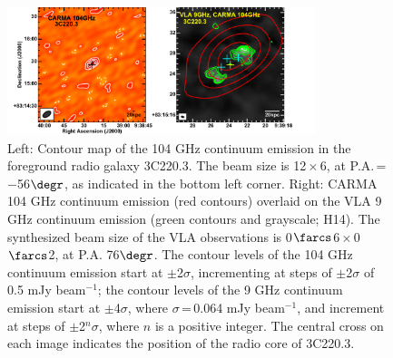 \documentclass[twocolumn,apj,numberedappendix]{emulateapj}
\newcommand{\CO}{\mbox{CO($J$\,=\,3\,$\rightarrow$\,2) }}
\newcommand{\pmOne}{\mbox{$^{-1}$}}
\begin{document}
\begin{figure}[tbph]
\centering
\includegraphics[width=0.80\textwidth]{Figure/ContPanel.pdf}
\caption{Left: Contour map of the 104 GHz continuum emission in the foreground radio galaxy 3C220.3. 
The beam size is 12\,$\times$\,6, at P.A.\,=\,
$-$56$\degr$, as indicated in the bottom left corner. Right: CARMA 104 GHz continuum emission (red contours) overlaid on the VLA 9 GHz continuum emission (green contours and grayscale; H14). 
The synthesized beam size of the VLA observations is 0$\farcs$6\,$\times$\,0$\farcs$2, at P.A. 
76$\degr$. The contour levels of the 104 GHz continuum emission start at $\pm$2$\sigma$, incrementing at steps 
of $\pm$2$\sigma$ of 0.5 mJy beam\pmOne; the contour levels of the 9 GHz continuum 
emission start at $\pm$4$\sigma$, where $\sigma$\,=\,0.064 mJy beam\pmOne, and increment at steps of $\pm$2$^n\sigma$, 
where $n$ is a positive integer.
The central cross on each image indicates the position of the radio core of 3C220.3. \label{fig:cont}}
\end{figure}
\end{document}
